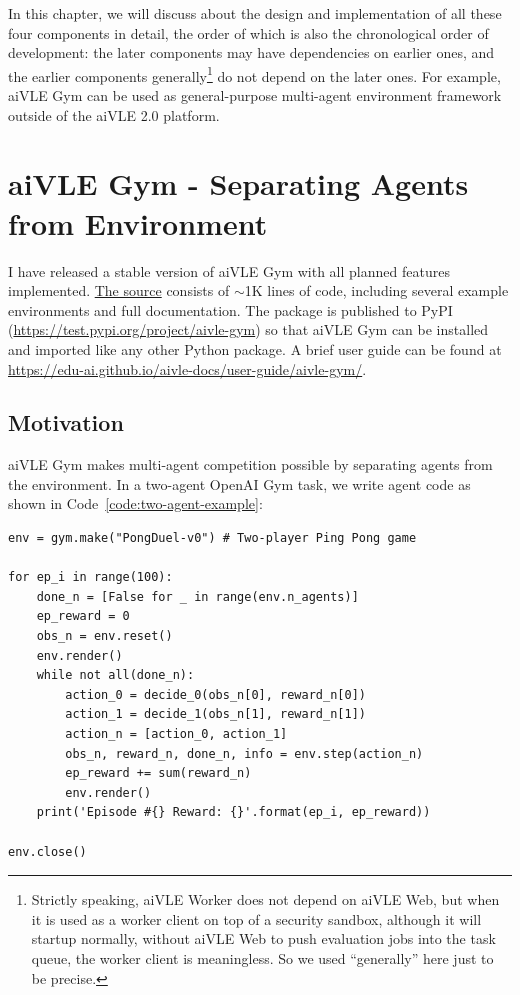In this chapter, we will discuss about the design and implementation of all these four components in detail, the order of which is also the chronological order of development: the later components may have dependencies on earlier ones, and the earlier components generally\footnote{Strictly speaking, aiVLE Worker does not depend on aiVLE Web, but when it is used as a worker client on top of a security sandbox, although it will startup normally, without aiVLE Web to push evaluation jobs into the task queue, the worker client is meaningless. So we used ``generally'' here just to be precise.} do not depend on the later ones. For example, aiVLE Gym can be used as general-purpose multi-agent environment framework outside of the aiVLE 2.0 platform.

\section{aiVLE Gym - Separating Agents from Environment}
\label{ch:aivle-gym}
I have released a stable version of aiVLE Gym with all planned features implemented. \href{https://github.com/edu-ai/aivle-gym}{The source} consists of $\sim$1K lines of code, including several example environments and full documentation. The package is published to PyPI  (\href{https://test.pypi.org/project/aivle-gym}{https://test.pypi.org/project/aivle-gym}) so that aiVLE Gym can be installed and imported like any other Python package. A brief user guide can be found at \href{https://edu-ai.github.io/aivle-docs/user-guide/aivle-gym/}{https://edu-ai.github.io/aivle-docs/user-guide/aivle-gym/}.

\subsection{Motivation}
aiVLE Gym makes multi-agent competition possible by separating agents from the environment. In a two-agent OpenAI Gym\parencite{openai-gym} task, we write agent code as shown in Code~\ref{code:two-agent-example}:

\begin{code}
\begin{verbatim}
env = gym.make("PongDuel-v0") # Two-player Ping Pong game

for ep_i in range(100):
    done_n = [False for _ in range(env.n_agents)]
    ep_reward = 0
    obs_n = env.reset()
    env.render()
    while not all(done_n):
        action_0 = decide_0(obs_n[0], reward_n[0])
        action_1 = decide_1(obs_n[1], reward_n[1])
        action_n = [action_0, action_1]
        obs_n, reward_n, done_n, info = env.step(action_n)
        ep_reward += sum(reward_n)
        env.render()
    print('Episode #{} Reward: {}'.format(ep_i, ep_reward))

env.close()
\end{verbatim}
\label{code:two-agent-example}
\end{code}

